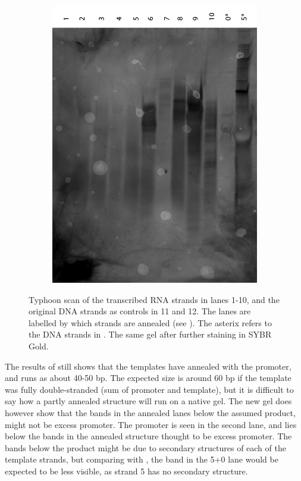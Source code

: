 \begin{figure}[h]
\begin{subfigure}[t]{0.49\textwidth}
    \includegraphics[width=\textwidth]{images/translator_transcription_2.png}
    \caption{}
    \label{transcription_2}
  \end{subfigure}
  \caption{ Typhoon scan of the transcribed RNA strands in lanes 1-10, and the original DNA strands as controls in 11 and 12. The lanes are labelled by which strands are annealed (see ). The asterix refers to the DNA strands in .  The same gel after further staining in SYBR Gold.}
  \label{transcriptions}
\end{figure}


The results of  still shows that the templates have annealed with the promoter, and runs as about 40-50 bp. The expected size is around 60 bp if the template was fully double-stranded (sum of promoter and template), but it is difficult to say how a partly annealed structure will run on a native gel. The new gel does however show that the bands in the annealed lanes below the assumed product, might not be excess promoter. The promoter is seen in the second lane, and lies below the bands in the annealed structure thought to be excess promoter. The bands below the product might be due to secondary structures of each of the template strands, but comparing with , the band in the 5+0 lane would be expected to be less visible, as strand 5 has no secondary structure.

